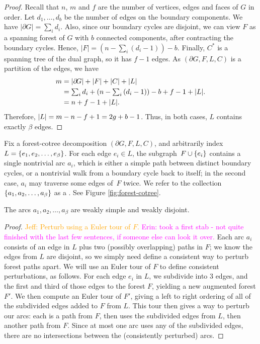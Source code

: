 \documentclass[letterpaper,review]{siamart190516}
\def\jnote#1{\textcolor{orange}{Jeff: #1}}
\def\enote#1{\textcolor{magenta}{Erin: #1}}
\begin{document}
\begin{proof}
Recall that $n$, $m$ and $f$ are the number of vertices, edges and faces of $G$ in order.
Let $d_1, \ldots, d_b$ be the number of edges on the boundary components.  
We have $|\partial\! G| = \sum_i {d_i}$.
Also, since our boundary cycles are disjoint, we can view $F$ as a spanning forest of $G$ with $b$ connected components, after contracting the boundary cycles.  Hence, $|F| = (n - \sum_i{(d_i-1)}) - b$.  Finally, $C^*$ is a spanning tree of the dual graph, so it has $f-1$ edges. As $(\partial\! G, F, L, C)$ is a partition of the edges, we have
\begin{align*}
	m &= \mathopen| \partial\! G \mathclose| + \mathopen| F \mathclose| + \mathopen| C \mathclose| + \mathopen| L \mathclose|
\\	&= \textstyle \sum_i d_i + (n - \sum_i{(d_i-1)}) - b + f-1 + \mathopen| L \mathclose|.
\\	&= n + f-1 + \mathopen| L \mathclose|.
\end{align*}
Therefore, $\mathopen| L \mathclose| = m - n - f + 1 = 2g + b - 1$.  Thus, in both cases, $L$ contains exactly $\beta$ edges.
\end{proof}

Fix a forest-cotree decomposition $(\partial\! G, F, L, C)$, and arbitrarily index $L = \{ e_1, e_2, \dots, e_\beta \}$.  For each edge $e_i\in L$, the subgraph~$F\cup \{ e_i \}$ contains a single nontrivial arc $a_i$, which is either a simple path between distinct boundary cycles, or a nontrivial walk from a boundary cycle back to itself; in the second case, $a_i$ may traverse some edges of~$F$ twice.  We refer to the collection $\{ a_1, a_2, \dots, a_\beta \}$ as a .  See Figure \ref{fig:forest-cotree}.

\begin{lemma}
The arcs $a_1, a_2, \dots, a_\beta$ are weakly simple and weakly disjoint.
\end{lemma}

\begin{proof}
\jnote{Perturb using a Euler tour of $F$.}
\enote{took a first stab - not quite finished with the last few sentences, if someone else can look it over.}
Each arc $a_i$ consists of an edge in $L$ plus two (possibly overlapping) paths in $F$; we know the edges from $L$ are disjoint, so we simply need define a consistent way to perturb forest paths apart.  We will use an Euler tour of $F$ to define consistent perturbations, as follows.
For each edge $e_i$ in $L$, we subdivide into 3 edges, and the first and third of those edges to the forest $F$, yielding a new augmented forest $F'$.  We then compute an Euler tour of $F'$, giving a left to right ordering of all of the subdivided edges added to $F$ from $L$. This tour then gives a way to perturb our arcs: each is a path from $F$, then uses the subdivided edges from $L$, then another path from $F$.   Since at most one arc uses any of the subdivided edges, there are no intersections between the (consistently perturbed) arcs.  
\end{proof}
\end{document}
